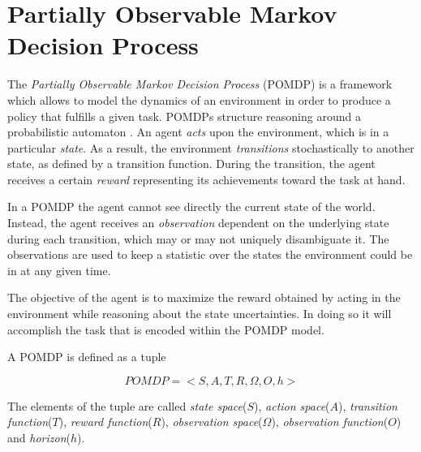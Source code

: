 \section{Partially Observable Markov Decision Process}\label{ref:pomdp}

The \textit{Partially Observable Markov Decision Process} (POMDP) \cite{cit:pomdp} is a framework
which allows to model the dynamics of an environment in order to produce a policy that fulfills a
given task. POMDPs structure reasoning around a probabilistic automaton \cite{cit:probautomata}. An
agent \textit{acts} upon the environment, which is in a particular \textit{state}. As a result, the
environment \textit{transitions} stochastically to another state, as defined by a transition
function. During the transition, the agent receives a certain \textit{reward} representing its
achievements toward the task at hand.

In a POMDP the agent cannot see directly the current state of the world. Instead, the agent receives
an \textit{observation} dependent on the underlying state during each transition, which may or may
not uniquely disambiguate it. The observations are used to keep a statistic over the states the
environment could be in at any given time.

The objective of the agent is to maximize the reward obtained by acting in the environment while
reasoning about the state uncertainties. In doing so it will accomplish the task that is encoded
within the POMDP model.

%
%
%
%
A POMDP is defined as a tuple

\begin{equation}
 POMDP = <S,A,T,R,\Omega,O,h>
\end{equation}

The elements of the tuple are called \textit{state space}($S$), \textit{action space}($A$),
\textit{transition function}($T$), \textit{reward function}($R$), \textit{observation
space}($\Omega$), \textit{observation function}($O$) and \textit{horizon}($h$).

